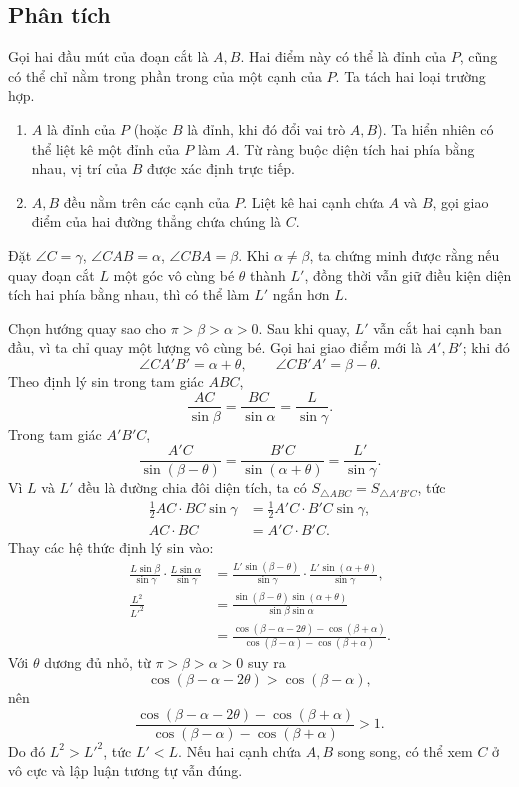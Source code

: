 \documentclass[11pt]{article}
\newcommand{\area}[1]{S_{#1}}
\begin{document}
\subsection*{Phân tích}

Gọi hai đầu mút của đoạn cắt là \(A,B\). Hai điểm này có thể là đỉnh của \(P\),
cũng có thể chỉ nằm trong phần trong của một cạnh của \(P\). Ta tách hai loại
trường hợp.

\begin{enumerate}
  \item \(A\) là đỉnh của \(P\) (hoặc \(B\) là đỉnh, khi đó đổi vai trò \(A,B\)).
  Ta hiển nhiên có thể liệt kê một đỉnh của \(P\) làm \(A\). Từ ràng buộc diện
  tích hai phía bằng nhau, vị trí của \(B\) được xác định trực tiếp.

  \item \(A,B\) đều nằm trên các cạnh của \(P\). Liệt kê hai cạnh chứa \(A\) và
  \(B\), gọi giao điểm của hai đường thẳng chứa chúng là \(C\).
\end{enumerate}

Đặt \(\angle C=\gamma\), \(\angle CAB=\alpha\),
\(\angle CBA=\beta\). Khi \(\alpha\ne\beta\), ta chứng minh được rằng nếu quay
đoạn cắt \(L\) một góc vô cùng bé \(\theta\) thành \(L'\), đồng thời vẫn giữ
điều kiện diện tích hai phía bằng nhau, thì có thể làm \(L'\) ngắn hơn \(L\).

Chọn hướng quay sao cho \(\pi>\beta>\alpha>0\). Sau khi quay, \(L'\) vẫn cắt
hai cạnh ban đầu, vì ta chỉ quay một lượng vô cùng bé. Gọi hai giao điểm mới là
\(A',B'\); khi đó
\[
  \angle CA'B'=\alpha+\theta,\qquad
  \angle CB'A'=\beta-\theta.
\]
Theo định lý sin trong tam giác \(ABC\),
\[
  \frac{AC}{\sin\beta}
  =\frac{BC}{\sin\alpha}
  =\frac{L}{\sin\gamma}.
\]
Trong tam giác \(A'B'C\),
\[
  \frac{A'C}{\sin(\beta-\theta)}
  =\frac{B'C}{\sin(\alpha+\theta)}
  =\frac{L'}{\sin\gamma}.
\]
Vì \(L\) và \(L'\) đều là đường chia đôi diện tích, ta có
\(\area{\triangle ABC}=\area{\triangle A'B'C}\), tức
\[
\begin{aligned}
  \frac12 AC\cdot BC\sin\gamma
    &=\frac12 A'C\cdot B'C\sin\gamma,\\
  AC\cdot BC&=A'C\cdot B'C.
\end{aligned}
\]
Thay các hệ thức định lý sin vào:
\[
\begin{aligned}
  \frac{L\sin\beta}{\sin\gamma}\cdot
  \frac{L\sin\alpha}{\sin\gamma}
  &=
  \frac{L'\sin(\beta-\theta)}{\sin\gamma}\cdot
  \frac{L'\sin(\alpha+\theta)}{\sin\gamma},\\
  \frac{L^2}{L'^2}
  &=
  \frac{\sin(\beta-\theta)\sin(\alpha+\theta)}
       {\sin\beta\sin\alpha}\\
  &=
  \frac{\cos(\beta-\alpha-2\theta)-\cos(\beta+\alpha)}
       {\cos(\beta-\alpha)-\cos(\beta+\alpha)}.
\end{aligned}
\]
Với \(\theta\) dương đủ nhỏ, từ \(\pi>\beta>\alpha>0\) suy ra
\[
  \cos(\beta-\alpha-2\theta)>\cos(\beta-\alpha),
\]
nên
\[
  \frac{\cos(\beta-\alpha-2\theta)-\cos(\beta+\alpha)}
       {\cos(\beta-\alpha)-\cos(\beta+\alpha)}>1.
\]
Do đó \(L^2>L'^2\), tức \(L'<L\). Nếu hai cạnh chứa \(A,B\) song song, có thể
xem \(C\) ở vô cực và lập luận tương tự vẫn đúng.
\end{document}
